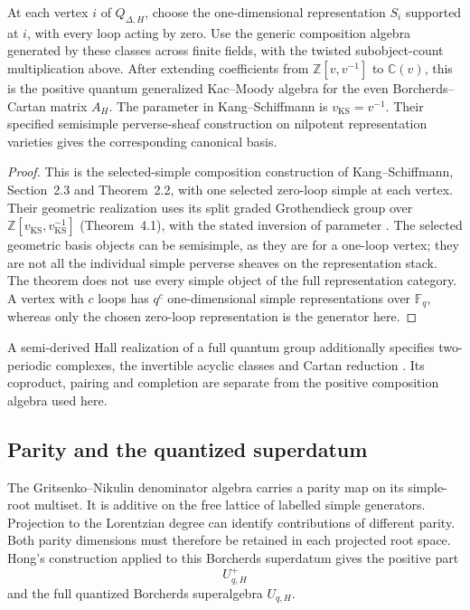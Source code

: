 \begin{theorem}
\label{comp:thm:quiver-composition}
At each vertex $i$ of $Q_{\Delta,H}$, choose the one-dimensional
representation $S_i$ supported at $i$, with every loop acting by zero.
Use the generic composition algebra generated by these classes across
finite fields, with the twisted subobject-count multiplication above.
After extending coefficients from $\mathbb Z[v,v^{-1}]$ to
$\mathbb C(v)$, this is the positive quantum generalized Kac--Moody
algebra for the even Borcherds--Cartan matrix $A_H$.
The parameter in Kang--Schiffmann is $v_{\mathrm{KS}}=v^{-1}$.
Their specified semisimple perverse-sheaf construction on nilpotent
representation varieties gives the corresponding canonical basis.
\end{theorem}
\begin{proof}
This is the selected-simple composition construction of
Kang--Schiffmann, Section~2.3 and Theorem~2.2, with one selected
zero-loop simple at each vertex. Their geometric realization uses
its split graded Grothendieck group over
$\mathbb Z[v_{\mathrm{KS}},v_{\mathrm{KS}}^{-1}]$
(Theorem~4.1), with the stated inversion of parameter
\cite{KangSchiffmann,KangSchiffmannAddendum}. The selected geometric
basis objects can be semisimple, as they are for a one-loop vertex;
they are not all the individual simple perverse sheaves on the
representation stack. The theorem does not use every simple object
of the full representation category. A vertex with $c$ loops has
$q^c$ one-dimensional simple representations over $\mathbb F_q$,
whereas only the chosen zero-loop representation is the generator here.
\end{proof}

A semi-derived Hall realization of a full quantum group additionally
specifies two-periodic complexes, the invertible acyclic classes and
Cartan reduction \cite{LuBorcherdsHall,AxtellLee}.
Its coproduct, pairing and completion are separate from the positive
composition algebra used here.

\subsection{Parity and the quantized superdatum}
The Gritsenko--Nikulin denominator algebra carries a parity map on its simple-root multiset.  It is additive on the free lattice of labelled simple generators.
Projection to the Lorentzian degree can identify contributions of
different parity. Both parity dimensions must therefore be retained
in each projected root space.  Hong's construction applied to this Borcherds superdatum gives the positive part
\[
 U_{q,H}^+
\]
and the full quantized Borcherds superalgebra $U_{q,H}$.

